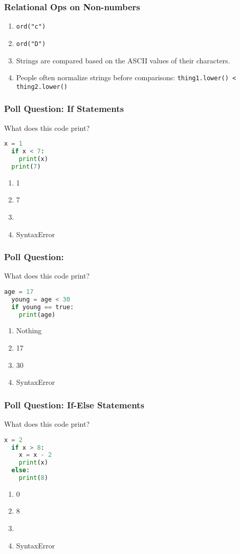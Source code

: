 \documentclass{beamer}
\begin{document}
%
%
\begin{frame}[fragile]
  \frametitle{Relational Ops on Non-numbers}
  \begin{enumerate}[A]
    \item \lstinline|ord("c")| 
    \item \lstinline|ord("D")| 
    \item Strings are compared based on the ASCII values of their characters.
    \item People often normalize strings before comparisons: \lstinline|thing1.lower() < thing2.lower()|
  \end{enumerate}
\end{frame}

%
%
\begin{frame}[fragile]
  \frametitle{Poll Question: If Statements}
  What does this code print?
  \begin{lstlisting}[language=Python, autogobble]
  x = 1
  if x < 7:
    print(x) 
  print(7)
  \end{lstlisting}
  \vfill
  \begin{enumerate}[A]
    \item 1
    \item 7
    \item {}
    \item SyntaxError
  \end{enumerate}
\end{frame}

%
%
\begin{frame}[fragile]
  \frametitle{Poll Question: }
  What does this code print?
  \begin{lstlisting}[language=Python, autogobble]
  age = 17
  young = age < 30
  if young == true:
    print(age)
  \end{lstlisting}
  \vfill
  \begin{enumerate}[A]
    \item Nothing
    \item 17
    \item 30
    \item SyntaxError
  \end{enumerate}
\end{frame}

%
%
\begin{frame}[fragile]
  \frametitle{Poll Question: If-Else Statements}
  What does this code print?
  \begin{lstlisting}[language=Python, autogobble]
  x = 2
  if x > 8:
    x = x - 2
    print(x)
  else:
    print(8)
  \end{lstlisting}
  \vfill
  \begin{enumerate}[A]
    \item 0
    \item 8
    \item {}
    \item SyntaxError
  \end{enumerate}
\end{frame}
\end{document}
